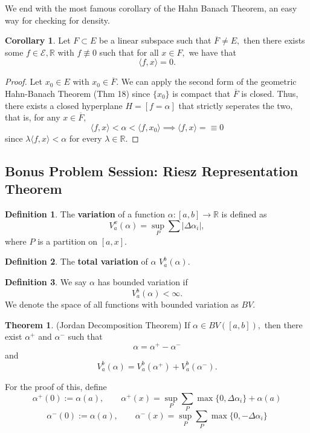 \documentclass[10pt, oneside]{article}
\newcommand{\bbR}{\mathbb{R}}
\theoremstyle{definition}
\newtheorem{thm}{Theorem}
\newtheorem{defn}{Definition}
\newtheorem{cor}{Corollary}
\begin{document}
We end with the most famous corollary of the Hahn Banach Theorem, an easy way for checking for density.

\begin{cor}
    Let $F\subset E$ be a linear subspace such that $\overline{F} \neq E,$ then there exists some $f\in \mathcal{E, \bbR}$ with $f \not \equiv 0$ such that for all $x\in F,$ we have that 
    \[\langle f, x \rangle = 0.\]
\end{cor}
\begin{proof}
    Let $x_0 \in E$ with $x_0 \in \overline{F}.$ We can apply the second form of the geometric Hahn-Banach Theorem (Thm 18) since $\{x_0\}$ is compact that $\overline{F}$ is closed. Thus, there exists a closed hyperplane $H = [f = \alpha]$ that strictly seperates the two, that is, for any $x\in \overline{F},$
    \[\langle f, x \rangle < \alpha < \langle f , x_0\rangle \implies \langle f, x\rangle = \equiv 0\] since $\lambda \langle f , x \rangle  < \alpha$ for every $\lambda \in \bbR.$
\end{proof}
\newpage
\subsection{Bonus Problem Session: Riesz Representation Theorem}
\begin{defn}
    The \textbf{variation} of a function $\alpha: [a,b]\to \bbR$ is defined as 
    \[V_a^x(\alpha) = \sup_{P} \sum |\Delta \alpha_i|,\] where $P$ is a partition on $[a,x].$
\end{defn}
\begin{defn}
    The \textbf{total variation} of $\alpha$ $V_a^b(\alpha).$
\end{defn}
\begin{defn}
    We say $\alpha$ has bounded variation if 
    \[V_a^b(\alpha) < \infty.\] We denote the space of all functions with bounded variation as $BV.$
\end{defn}
\begin{thm}
(Jordan Decomposition Theorem)
    If $\alpha \in BV([a,b]),$ then there exist $\alpha^+$ and $\alpha^-$ such that 
    \[\alpha = \alpha^+ - \alpha^-\] and 
    \[V_a^b(\alpha) = V_a^b(\alpha^+) + V_a^b(\alpha^-).\] 
\end{thm}
For the proof of this, define 
\[\alpha^+(0) := \alpha(a), \qquad \alpha^+(x) = \sup_P \sum_P \max\{0, \Delta \alpha_i\} + \alpha(a)\]
\[\alpha^-(0) := \alpha(a), \qquad \alpha^-(x) = \sup_P \sum_P \max\{0, -\Delta \alpha_i\}\]
\end{document}
